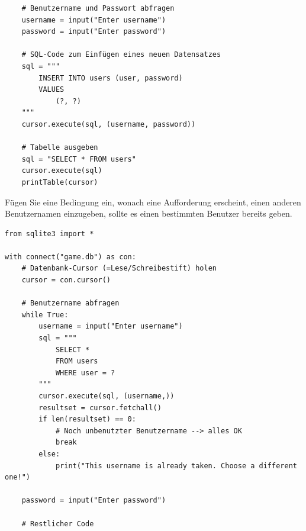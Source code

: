 \begin{mychallenge}
\begin{myanswer}
\begin{lstlisting}
    # Benutzername und Passwort abfragen
    username = input("Enter username")
    password = input("Enter password")

    # SQL-Code zum Einfügen eines neuen Datensatzes
    sql = """
        INSERT INTO users (user, password)
        VALUES
            (?, ?)
    """
    cursor.execute(sql, (username, password))

    # Tabelle ausgeben
    sql = "SELECT * FROM users"
    cursor.execute(sql)
    printTable(cursor)
\end{lstlisting}
    \end{myanswer}

\end{mychallenge}

\begin{mychallenge}
    Fügen Sie eine Bedingung ein, wonach eine Aufforderung erscheint, einen anderen Benutzernamen einzugeben, sollte es einen bestimmten Benutzer bereits geben.
    \begin{myanswer}
        \begin{lstlisting}
from sqlite3 import *

with connect("game.db") as con:
    # Datenbank-Cursor (=Lese/Schreibestift) holen
    cursor = con.cursor()

    # Benutzername abfragen
    while True:
        username = input("Enter username")
        sql = """
            SELECT *
            FROM users
            WHERE user = ?
        """
        cursor.execute(sql, (username,))
        resultset = cursor.fetchall()
        if len(resultset) == 0:
            # Noch unbenutzter Benutzername --> alles OK
            break
        else:
            print("This username is already taken. Choose a different one!")

    password = input("Enter password")

    # Restlicher Code

\end{lstlisting}
    \end{myanswer}
\end{mychallenge}

